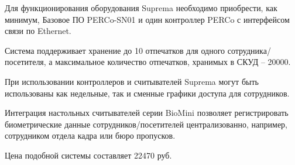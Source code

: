 Для функционирования оборудования Suprema необходимо приобрести, как минимум, Базовое ПО PERCo-SN01 и один контроллер PERCo с интерфейсом связи по Ethernet.

Система поддерживает хранение до 10 отпечатков для одного сотрудника/посетителя, а максимальное количество отпечатков, хранимых в СКУД -- 20000.

При использовании контроллеров и считывателей Suprema могут быть использованы как недельные, так и сменные графики доступа для сотрудников.

Интеграция настольных считывателей серии BioMini позволяет регистрировать биометрические данные сотрудников/посетителей централизованно, например, сотрудником отдела кадра или бюро пропусков.

Цена подобной системы составляет 22470 руб.
